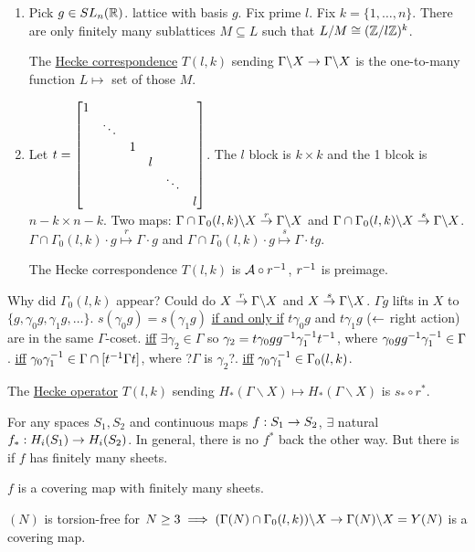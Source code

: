 \documentclass[]{article}
\begin{document}
\begin{enumerate}
	\item Pick $g\in SL_n(\mathbb{R})$. lattice with basis $g$. Fix prime $l$. Fix $k = \{1,\dots,n\}$. There are only finitely many sublattices $M\subseteq L$ such that $L/M \cong (\mathbb{Z}/l\mathbb{Z})^k$.
	\begin{definition}
		The \ul{Hecke correspondence} $T(l,k)$ sending $\Gamma\backslash X \rightarrow \Gamma \backslash X$ is the one-to-many function $L\mapsto $ set of those $M$.
	\end{definition}
	\item Let $t = \begin{bmatrix}1 \\ &\ddots \\ &&1 \\ &&&l \\ &&&& \ddots \\ &&&&&l\end{bmatrix}$. The $l$ block is $k\times k$ and the 1 blcok is $n-k\times n-k$. Two maps: $\Gamma\cap \Gamma_0(l,k)\backslash X \overset{r}{\rightarrow} \Gamma\backslash X$ and $\Gamma\cap \Gamma_0(l,k)\backslash X \overset{s}{\rightarrow} \Gamma\backslash X$. $\Gamma\cap \Gamma_0(l,k)\cdot g \overset{r}{\mapsto} \Gamma\cdot g$ and $\Gamma\cap \Gamma_0(l,k)\cdot g \overset{s}{\mapsto} \Gamma\cdot tg$.
	\begin{definition}
		The Hecke correspondence $T(l,k)$ is $\mathcal{A}\circ r^{-1}$, $r^{-1}$ is preimage.
	\end{definition}
\end{enumerate}
Why did $\Gamma_0(l,k)$ appear? Could do $X\overset{r}{\rightarrow} \Gamma\backslash X$ and $X\overset{s}{\rightarrow} \Gamma\backslash X$.
$\Gamma g$ lifts in $X$ to $\{g,\gamma_0g,\gamma_1g,\dots\}$. $s(\gamma_0g) = s(\gamma_1g)$ \ul{if and only if} $t\gamma_0g$ and $t\gamma_1g$ ($\leftarrow$ right action) are in the same $\Gamma$-coset.
\ul{iff} $\exists \gamma_2 \in \Gamma$ so $\gamma_2 = t\gamma_0gg^{-1} \gamma_1^{-1} t^{-1}$, where $\gamma_0gg^{-1}\gamma_1^{-1}\in \Gamma$. \ul{iff} $\gamma_0\gamma_1^{-1} \in \Gamma\cap[t^{-1} \Gamma t]$, where ?$\Gamma$ is $\gamma_2$?. \ul{iff} $\gamma_0\gamma_1^{-1} \in \Gamma_0(l,k)$.
\begin{definition}
	The \ul{Hecke operator} $T(l,k)$ sending $H_*(\Gamma\backslash X)\mapsto H_*(\Gamma\backslash X)$ is $s_*\circ r^*$.
\end{definition}
For any spaces $S_1,S_2$ and continuous maps $f:S_1\rightarrow S_2$, $\exists$ natural $f_*:H_i(S_1)\rightarrow H_i(S_2)$. In general, there is no $f^*$ back the other way. But there is if $f$ has finitely many sheets.
\begin{example}
	$f$ is a covering map with finitely many sheets.
\end{example}
$(N)$ is torsion-free for $N\geq 3 \implies (\Gamma(N)\cap \Gamma_0(l,k))\backslash X \rightarrow \Gamma(N)\backslash X = Y(N)$ is a covering map.
\end{document}
